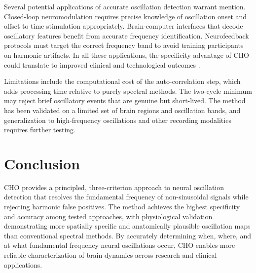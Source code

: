 \documentclass[12pt]{article}
\begin{document}
Several potential applications of accurate oscillation detection warrant mention. Closed-loop neuromodulation requires precise knowledge of oscillation onset and offset to time stimulation appropriately. Brain-computer interfaces that decode oscillatory features benefit from accurate frequency identification. Neurofeedback protocols must target the correct frequency band to avoid training participants on harmonic artifacts. In all these applications, the specificity advantage of CHO could translate to improved clinical and technological outcomes \citep{buzsaki2004neuronal, engel2001dynamic}.

Limitations include the computational cost of the auto-correlation step, which adds processing time relative to purely spectral methods. The two-cycle minimum may reject brief oscillatory events that are genuine but short-lived. The method has been validated on a limited set of brain regions and oscillation bands, and generalization to high-frequency oscillations and other recording modalities requires further testing.

\section{Conclusion}

CHO provides a principled, three-criterion approach to neural oscillation detection that resolves the fundamental frequency of non-sinusoidal signals while rejecting harmonic false positives. The method achieves the highest specificity and accuracy among tested approaches, with physiological validation demonstrating more spatially specific and anatomically plausible oscillation maps than conventional spectral methods. By accurately determining when, where, and at what fundamental frequency neural oscillations occur, CHO enables more reliable characterization of brain dynamics across research and clinical applications.



\end{document}
